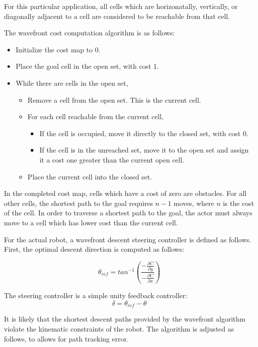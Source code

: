 \documentclass[11pt]{article} %
\begin{document}
For this particular application, all cells which are horizonatally, vertically, or diagonally adjacent to a cell are considered to be reachable from that cell.

The wavefront cost computation algorithm is as follows:

\begin{itemize}
 \item Initialize the cost map to 0.
 \item Place the goal cell in the open set, with cost 1.
 \item While there are cells in the open set, \begin{itemize}
  \item Remove a cell from the open set.  This is the current cell.
  \item For each cell reachable from the current cell, \begin{itemize}
    \item If the cell is occupied, move it directly to the closed set, with cost 0.
    \item If the cell is in the unreached set, move it to the open set and assign it a cost one greater than the current open cell.
  \end{itemize}
  \item Place the current cell into the closed set.
 \end{itemize}
\end{itemize}

In the completed cost map, cells which have a cost of zero are obstacles.  For all other cells, the shortest path to the goal requires $n-1$ moves, where $n$ is the cost of the cell.  In order to traverse a shortest path to the goal, the actor must always move to a cell which has lower cost than the current cell.

For the actual robot, a wavefront descent steering controller is defined as follows.  First, the optimal descent direction is computed as follows:

\begin{equation}
\theta_{ref} = tan^{-1}( \frac{ - \frac{\partial C}{\partial y} }{ - \frac{\partial C}{\partial x} } )
\end{equation}

The steering controller is a simple unity feedback controller:
\begin{equation}
\delta = \theta_{ref} - \theta 
\end{equation}

It is likely that the shortest descent paths provided by the wavefront algorithm violate the kinematic constraints of the robot.  The algorithm is adjusted as follows, to allows for path tracking error.  
\end{document}
